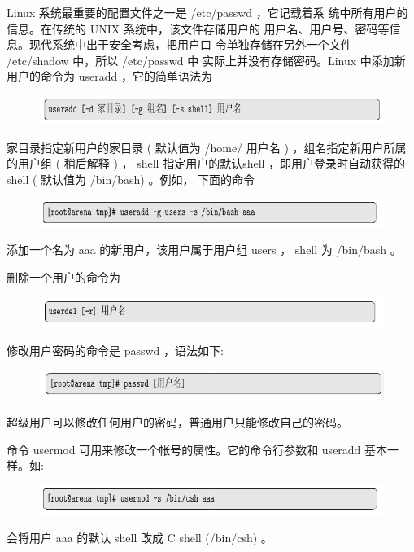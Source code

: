 \documentclass[12pt，a4paper]{article}
\numberwithin{equation}{section}
\begin{document}
Linux 系统最重要的配置文件之一是 /etc/passwd ，它记载着系
统中所有用户的信息。在传统的 UNIX 系统中，该文件存储用户的
用户名、用户号、密码等信息。现代系统中出于安全考虑，把用户口
令单独存储在另外一个文件 /etc/shadow 中，所以 /etc/passwd 中
实际上并没有存储密码。Linux 中添加新用户的命令为 useradd ，它的简单语法为
\begin{figure}[H]
\centering
\includegraphics[scale=0.6]{./figures/23.png}
\end{figure}
家目录指定新用户的家目录 ( 默认值为 /home/ 用户名 ) ，组名指定新用户所属的用户组 ( 稍后解释 ) ， shell 指定用户的默认shell ，即用户登录时自动获得的 shell ( 默认值为 /bin/bash) 。例如，
下面的命令
\begin{figure}[H]
\centering
\includegraphics[scale=0.6]{./figures/24.png}
\end{figure}
添加一个名为 aaa 的新用户，该用户属于用户组 users ， shell 为
/bin/bash 。

删除一个用户的命令为
\begin{figure}[H]
\centering
\includegraphics[scale=0.6]{./figures/25.png}
\end{figure}
修改用户密码的命令是 passwd ，语法如下:
\begin{figure}[H]
\centering
\includegraphics[scale=0.6]{./figures/26.png}
\end{figure}
超级用户可以修改任何用户的密码，普通用户只能修改自己的密码。

命令 usermod 可用来修改一个帐号的属性。它的命令行参数和
useradd 基本一样。如:
\begin{figure}[H]
\centering
\includegraphics[scale=0.6]{./figures/27.png}
\end{figure}
会将用户 aaa 的默认 shell 改成 C shell (/bin/csh) 。
\end{document}
